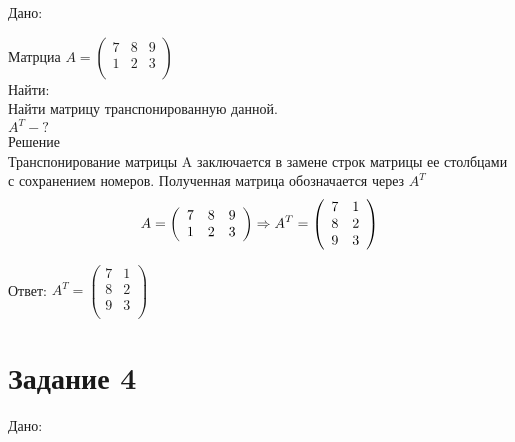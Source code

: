 \documentclass[a4paper,12pt]{article} %
\begin{document}
Дано:

Матрциа ${A} =
\left( \begin{array}{ccc}
7 & 8 & 9 \\
1 & 2 & 3 \\
\end{array} \right)$\\
Найти:\\
Найти матрицу транспонированную данной.\\
$A^{T} -?$ \\
Решение\\
Транспонирование матрицы A заключается в замене строк матрицы ее
столбцами с сохранением номеров. Полученная матрица обозначается через $A^{T}$\\
\begin{displaymath}\\
{A} =
\left( \begin{array}{ccc}
7 & 8 & 9 \\
1 & 2 & 3 \\
\end{array} \right) \Rightarrow A^{T} = \left( \begin{array}{cc}
7 & 1  \\
8 & 2 \\
9 & 3\\
\end{array} \right)
\end{displaymath}

Ответ:  $A^{T} = \left( \begin{array}{cc}
7 & 1  \\
8 & 2 \\
9 & 3\\
\end{array} \right)$

\section{Задание 4}

Дано:
\end{document}
